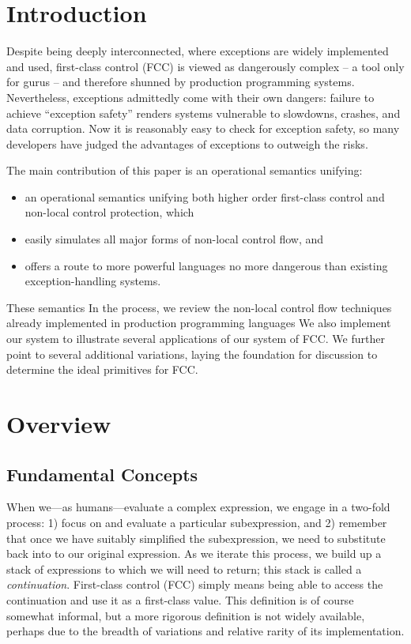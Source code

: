 \documentclass[11pt]{article}
\begin{document}
\section{Introduction}

Despite being deeply interconnected, where exceptions are widely implemented and used, first-class control (FCC) is viewed as dangerously complex -- a tool only for gurus -- and therefore shunned by production programming systems.
Nevertheless, exceptions admittedly come with their own dangers: failure to achieve ``exception safety'' renders systems vulnerable to slowdowns, crashes, and data corruption.
Now it is reasonably easy to check for exception safety, so many developers have judged the advantages of exceptions to outweigh the risks.

The main contribution of this paper is an operational semantics unifying:
\begin{itemize}
\item an operational semantics unifying both higher order first-class control and non-local control protection, which
\item easily simulates all major forms of non-local control flow, and
\item offers a route to more powerful languages no more dangerous than existing exception-handling systems.
\end{itemize}
These semantics
In the process, we review the non-local control flow techniques already implemented in production programming languages
We also implement our system to illustrate several applications of our system of FCC.
We further point to several additional variations, laying the foundation for discussion to determine the ideal primitives for FCC.

\section{Overview}

\subsection{Fundamental Concepts}
When we---as humans---evaluate a complex expression, we engage in a two-fold process: 1) focus on and evaluate a particular subexpression, and 2) remember that once we have suitably simplified the subexpression, we need to substitute back into to our original expression.
As we iterate this process, we build up a stack of expressions to which we will need to return; this stack is called a \emph{continuation}.
First-class control (FCC) simply means being able to access the continuation and use it as a first-class value.
This definition is of course somewhat informal, but a more rigorous definition is not widely available, perhaps due to the breadth of variations and relative rarity of its implementation.
\end{document}
